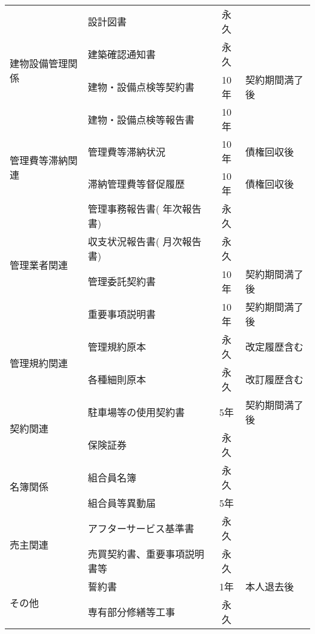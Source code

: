 \documentclass[
  luatex,
  paper=a4paper,
  fontsize=11pt,
  jafontsize=11pt,
  jlreq_notes,
]{jlreq}
\begin{document}
\begin{table}[htbp]
{\begin{tabular}{|l|l|c|l|}
                                  \hline
        \multirow{4}{*}{建物設備管理関係} & 設計図書 & 永久 & \\ \cline{2-4}
                                  & 建築確認通知書 & 永久 & \\ \cline{2-4}
                                  & 建物・設備点検等契約書 & 10年 & 契約期間満了後 \\ \cline{2-4}
                                  & 建物・設備点検等報告書 & 10年 & \\ \cline{2-4}
                                  \hline
        \multirow{2}{*}{管理費等滞納関連} & 管理費等滞納状況 & 10年 &  債権回収後 \\ \cline{2-4}
                                  & 滞納管理費等督促履歴 & 10年 & 債権回収後\\ \cline{2-4}
                                  \hline
        \multirow{4}{*}{管理業者関連} & 管理事務報告書( 年次報告書) & 永久 & \\ \cline{2-4}
                                  & 収支状況報告書( 月次報告書) & 永久 & \\ \cline{2-4}
                                  & 管理委託契約書 & 10年 & 契約期間満了後 \\ \cline{2-4}
                                  &  重要事項説明書 & 10年 & 契約期間満了後 \\ \cline{2-4}
                                  \hline
        \multirow{2}{*}{管理規約関連} & 管理規約原本 & 永久 & 改定履歴含む \\ \cline{2-4}
                                  & 各種細則原本 & 永久 & 改訂履歴含む \\ \cline{2-4}
                                  \hline
        \multirow{2}{*}{契約関連} & 駐車場等の使用契約書 & 5年 & 契約期間満了後 \\ \cline{2-4}
                                  &  保険証券 & 永久 &  \\ \cline{2-4}
                                  \hline
        \multirow{2}{*}{名簿関係} & 組合員名簿 & 永久 &  \\ \cline{2-4}
                                  &  組合員等異動届 & 5年 &  \\ \cline{2-4}
                                  \hline
        \multirow{2}{*}{売主関連} & アフターサービス基準書 & 永久 &  \\ \cline{2-4}
                                  & 売買契約書、重要事項説明書等 & 永久 &  \\ \cline{2-4}
                                  \hline
        \multirow{2}{*}{その他} & 誓約書 & 1年 & 本人退去後 \\ \cline{2-4}
                                  &  専有部分修繕等工事 & 永久 & \\ \cline{2-4}
                                  \hline
      \end{tabular}
    }
  \end{table}
\end{document}
